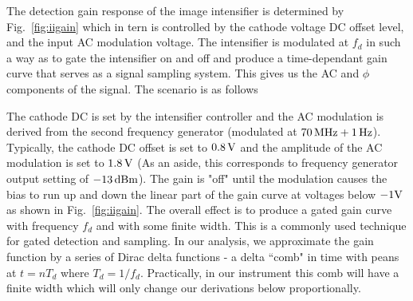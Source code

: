 The detection gain response of the image intensifier is determined by Fig.~\ref{fig:iigain} which in tern is controlled by the cathode voltage DC offset level, and the input AC modulation voltage. The intensifier is modulated at $f_d$ in such a way as to gate the intensifier on and off and produce a time-dependant gain curve that serves as a signal sampling system. This gives us the AC and $\phi$ components of the signal. The scenario is as follows

The cathode DC is set by the intensifier controller and the AC modulation is derived from the second frequency generator (modulated at $70\,{\rm MHz}+1\,{\rm Hz}$). Typically, the cathode DC offset is set to $0.8\,\rm{V}$ and the amplitude of the AC modulation is set to $1.8\,\rm{V}$ (As an aside, this corresponds to frequency generator output setting of $-13\,\rm{dBm}$). The gain is "off" until the modulation causes the bias to run up and down the linear part of the gain curve at voltages below $-1\rm{V}$ as shown in Fig.~\ref{fig:iigain}. The overall effect is to produce a gated gain curve with frequency $f_d$ and with some finite width. This is a commonly used technique for gated detection and sampling. In our analysis, we approximate the gain function by a series of Dirac delta functions - a delta ``comb" in time with peans at $t=nT_d$ where $T_d = 1/f_{d}$. Practically, in our instrument this comb will have a finite width which will only change our derivations below proportionally.

